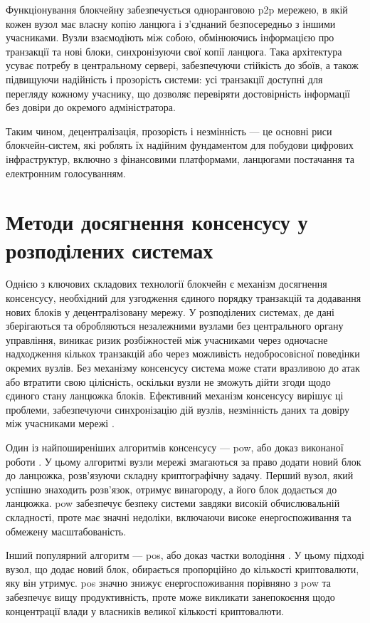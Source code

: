 \documentclass[14pt]{extreport}
\begin{document}
  Функціонування блокчейну забезпечується одноранговою \gls{p2p} мережею, в якій кожен вузол має власну копію ланцюга і з'єднаний безпосередньо з іншими учасниками. Вузли взаємодіють між собою, обмінюючись інформацією про транзакції та нові блоки, синхронізуючи свої копії ланцюга. Така архітектура усуває потребу в центральному сервері, забезпечуючи стійкість до збоїв, а також підвищуючи надійність і прозорість системи: усі транзакції доступні для перегляду кожному учаснику, що дозволяє перевіряти достовірність інформації без довіри до окремого адміністратора.

  Таким чином, децентралізація, прозорість і незмінність — це основні риси блокчейн-систем, які роблять їх надійним фундаментом для побудови цифрових інфраструктур, включно з фінансовими платформами, ланцюгами постачання та електронним голосуванням.

  \section{Методи досягнення консенсусу у розподілених системах}

  Однією з ключових складових технології блокчейн є механізм досягнення консенсусу, необхідний для узгодження єдиного порядку транзакцій та додавання нових блоків у децентралізовану мережу. У розподілених системах, де дані зберігаються та обробляються незалежними вузлами без центрального органу управління, виникає ризик розбіжностей між учасниками через одночасне надходження кількох транзакцій або через можливість недобросовісної поведінки окремих вузлів. Без механізму консенсусу система може стати вразливою до атак або втратити свою цілісність, оскільки вузли не зможуть дійти згоди щодо єдиного стану ланцюжка блоків. Ефективний механізм консенсусу вирішує ці проблеми, забезпечуючи синхронізацію дій вузлів, незмінність даних та довіру між учасниками мережі \cite{consensus}.

  Один із найпоширеніших алгоритмів консенсусу — \gls{pow}, або доказ виконаної роботи \cite{pow}. У цьому алгоритмі вузли мережі змагаються за право додати новий блок до ланцюжка, розв'язуючи складну криптографічну задачу. Перший вузол, який успішно знаходить розв'язок, отримує винагороду, а його блок додається до ланцюжка. \gls{pow} забезпечує безпеку системи завдяки високій обчислювальній складності, проте має значні недоліки, включаючи високе енергоспоживання та обмежену масштабованість.

  Інший популярний алгоритм — \gls{pos}, або доказ частки володіння \cite{pos}. У цьому підході вузол, що додає новий блок, обирається пропорційно до кількості криптовалюти, яку він утримує. \gls{pos} значно знижує енергоспоживання порівняно з \gls{pow} та забезпечує вищу продуктивність, проте може викликати занепокоєння щодо концентрації влади у власників великої кількості криптовалюти.
\end{document}
